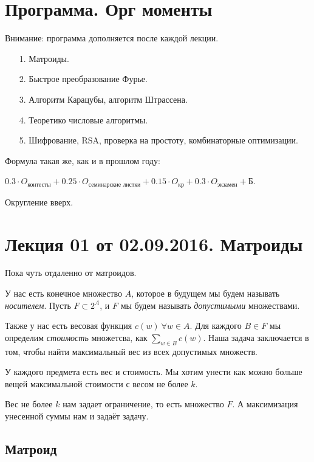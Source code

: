\documentclass[a4paper, 12pt]{article}
\begin{document}
\pagestyle{fancy}

\section{Программа. Орг моменты}

Внимание: программа дополняется после каждой лекции.
\begin{itemize}
  \item[1.] Матроиды.
  \item[2.] Быстрое преобразование Фурье.
  \item[3.] Алгоритм Карацубы, алгоритм Штрассена.
  \item[4.] Теоретико числовые алгоритмы.
  \item[5.] Шифрование, RSA, проверка на простоту, комбинаторные 
  оптимизации.
\end{itemize}

Формула такая же, как и в прошлом году: 

$0.3\cdot O_{\text{контесты}} + 0.25
\cdot O_{\text{семинарские листки}} + 0.15 \cdot O_{\text{кр}} + 0.3\cdot 
O_{\text{экзамен}} + \text{Б}$.

 Округление вверх.

\section{Лекция 01 от 02.09.2016. Матроиды}

Пока чуть отдаленно от матроидов.

У нас есть конечное множество $A$, которое в будущем мы будем называть 
\textit{носителем}. Пусть $F \subset 2^{A}$, и $F$ мы будем называть 
\textit{допустимыми} множествами.

Также у нас есть весовая функция $c(w) \ \forall w \in A$. 
Для каждого $B \in F$ мы определим \textit{стоимость} 
множетсва, как $\sum\limits_{w \in B} c(w)$. Наша задача 
заключается в том, чтобы найти максимальный вес из всех допустимых множеств.

\begin{Examples}
У каждого предмета есть вес и стоимость. Мы хотим унести как можно больше 
вещей максимальной стоимости с весом не более $k$.

Вес не более $k$ нам задает ограничение, то есть множество $F$.
А максимизация унесенной суммы нам и задаёт задачу.
\end{Examples}

\subsection{Матроид}
\end{document}
